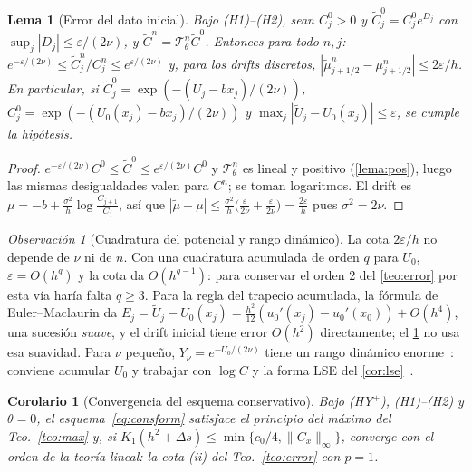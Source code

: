 \documentclass[11pt,letterpaper]{article}
\theoremstyle{plain}
\newtheorem{lema}[theorem]{Lema}
\newtheorem{corolario}[theorem]{Corolario}
\theoremstyle{definition}
\theoremstyle{remark}
\newtheorem{observacion}[theorem]{Observación}
\numberwithin{equation}{section}
\newcommand{\norm}[1]{\lVert #1\rVert}
\newcommand{\Top}{\mathcal{T}}
\begin{document}
	\begin{lema}[Error del dato inicial]\label{lema:dato}
		Bajo (H1)--(H2), sean \(C^0_j>0\) y \(\tilde C^0_j=C^0_je^{D_j}\) con \(\sup_j|D_j|\le\varepsilon/(2\nu)\), y \(\tilde C^n=\Top_\theta^n\tilde C^0\). Entonces para todo \(n,j\): \(e^{-\varepsilon/(2\nu)}\le\tilde C^n_j/C^n_j\le e^{\varepsilon/(2\nu)}\) y, para los drifts discretos, \(|\tilde\mu^n_{j+1/2}-\mu^n_{j+1/2}|\le2\varepsilon/h\). En particular, si \(\tilde C^0_j=\exp(-(\tilde U_j-bx_j)/(2\nu))\), \(C^0_j=\exp(-(U_0(x_j)-bx_j)/(2\nu))\) y \(\max_j|\tilde U_j-U_0(x_j)|\le\varepsilon\), se cumple la hipótesis.
	\end{lema}
	
	\begin{proof}
		\(e^{-\varepsilon/(2\nu)}C^0\le\tilde C^0\le e^{\varepsilon/(2\nu)}C^0\) y \(\Top_\theta^n\) es lineal y positivo (\cref{lema:pos}), luego las mismas desigualdades valen para \(C^n\); se toman logaritmos. El drift es \(\mu=-b+\frac{\sigma^2}h\log\frac{C_{j+1}}{C_j}\), así que \(|\tilde\mu-\mu|\le\frac{\sigma^2}h\bigl(\frac\varepsilon{2\nu}+\frac\varepsilon{2\nu}\bigr)=\frac{2\varepsilon}h\) pues \(\sigma^2=2\nu\).
	\end{proof}
	
	\begin{observacion}[Cuadratura del potencial y rango dinámico]
		La cota \(2\varepsilon/h\) no depende de \(\nu\) ni de \(n\). Con una cuadratura acumulada de orden \(q\) para \(U_0\), \(\varepsilon=O(h^q)\) y la cota da \(O(h^{q-1})\): para conservar el orden 2 del \cref{teo:error} por esta vía haría falta \(q\ge3\). Para la regla del trapecio acumulada, la fórmula de Euler--Maclaurin da \(E_j=\tilde U_j-U_0(x_j)=\frac{h^2}{12}(u_0'(x_j)-u_0'(x_0))+O(h^4)\), una sucesión \emph{suave}, y el drift inicial tiene error \(O(h^2)\) directamente; el \cref{lema:dato} no usa esa suavidad. Para \(\nu\) pequeño, \(Y_\nu=e^{-U_0/(2\nu)}\) tiene un rango dinámico enorme~\cite{Ohwada2009}: conviene acumular \(U_0\) y trabajar con \(\log C\) y la forma LSE del \cref{cor:lse}~\cite{BlanchardHigham2021}.
	\end{observacion}
	
	\begin{corolario}[Convergencia del esquema conservativo]\label{cor:conv}
		Bajo (HY\(^+\)), (H1)--(H2) y \(\theta=0\), el esquema~\eqref{eq:consform} satisface el principio del máximo del Teo.~\ref{teo:max} y, si \(K_1(h^2+\Delta s)\le\min\{c_0/4,\norm{C_x}_\infty\}\), converge con el orden de la teoría lineal: la cota (ii) del Teo.~\ref{teo:error} con \(p=1\).
	\end{corolario}
	
\end{document}
